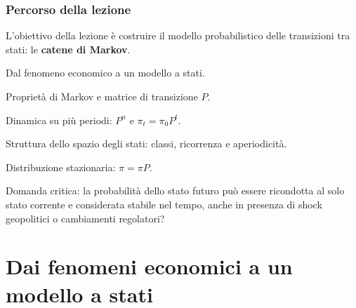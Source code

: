 \begin{frame}%
%

\frametitle{Percorso della lezione}%
%

%


L'obiettivo della lezione \`{e} costruire il modello probabilistico delle
transizioni tra stati: le \textbf{catene di Markov}.

\medskip

\begin{stepenumerate}
\item[1.] Dal fenomeno economico a un modello a stati.

\item[2.] Propriet\`{a} di Markov e matrice di transizione $P$.

\item[3.] Dinamica su pi\`{u} periodi: $P^{n}$ e $\pi_{t}=\pi_{0}P^{t}$.

\item[4.] Struttura dello spazio degli stati: classi, ricorrenza e aperiodicit\`{a}.

\item[5.] Distribuzione stazionaria: $\pi=\pi P$.
\end{stepenumerate}

\medskip

\begin{center}
{\small Domanda critica: la probabilit\`{a} dello stato futuro pu\`{o} essere
ricondotta al solo stato corrente e considerata stabile nel tempo, anche in
presenza di shock geopolitici o cambiamenti regolatori?}
\end{center}

%

\transboxout
\end{frame}%




\section{Dai fenomeni economici a un modello a stati}


